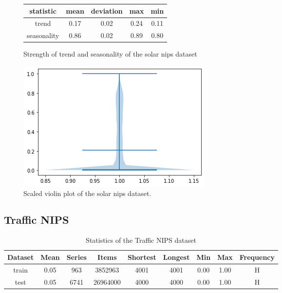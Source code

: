 \begin{figure}[htb]
  \centering
  \begin{center}
    \begin{tabular}{||c | c | c | c | c |}
      \hline
      statistic   & mean & deviation & max  & min  \\
      \hline
      trend       & 0.17 & 0.02      & 0.24 & 0.11 \\
      \hline
      seasonality & 0.86 & 0.02      & 0.89 & 0.80 \\
      \hline
      \hline
    \end{tabular}
    \caption{Strength of trend and seasonality of the solar nips dataset}
  \end{center}
  \endminipage\hfill
  \includegraphics[width=\linewidth]{./img/solar_nips_violin.png}
  \caption{Scaled violin plot of the solar nips dataset.}
  \label{fig:solar_nips_violin}
  \endminipage\hfill
\end{figure}


\clearpage
\subsection{Traffic NIPS}
\begin{table}[htb]
  \begin{tabular}{||c | c c c c c c c c ||}
    \hline
    Dataset & Mean & Series & Items    & Shortest & Longest & Min  & Max  & Frequency \\ [0.5ex]
    \hline\hline
    train   & 0.05 & 963    & 3852963  & 4001     & 4001    & 0.00 & 1.00 & H         \\
    \hline
    test    & 0.05 & 6741   & 26964000 & 4000     & 4000    & 0.00 & 1.00 & H         \\
    \hline
  \end{tabular}
  \caption{Statistics of the Traffic NIPS dataset}
\end{table}


